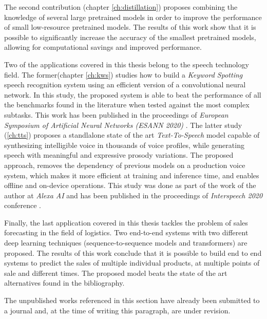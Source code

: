 The second contribution (chapter \ref{ch:distillation}) proposes combining the knowledge of several large pretrained models in order to improve the performance of small low-resource pretrained models. The results of this work show that it is possible to significantly increase the accuracy of the smallest pretrained models, allowing for computational savings and improved performance.

Two of the applications covered in this thesis belong to the speech technology field. The former(chapter \ref{ch:kws}) studies how to build a \textit{Keyword Spotting} speech recognition system using an efficient version of a convolutional neural network. In this study, the proposed system is able to beat the performance of all the benchmarks found in the literature when tested against the most complex subtasks. This work has been published in the proceedings of \textit{European Symposium of Artificial Neural Networks (ESANN 2020)} \autocite{valles2021a}. The latter study (\ref{ch:tts}) proposes a standlalone state of the art \textit{Text-To-Speech} model capable of synthesizing intelligible voice in thousands of voice profiles, while generating speech with meaningful and expressive prosody variations. The proposed approach, removes the dependency of previous models on a production voice system, which makes it more efficient at training and inference time, and enables offline and on-device operations. This study was done as part of the work of the author at \textit{Alexa AI} and has been published in the proceedings of \textit{Interspeech 2020} conference \autocite{valles2021b}.

Finally, the last application covered in this thesis tackles the problem of sales forecasting in the field of logistics. Two end-to-end systems with two different deep learning techniques (sequence-to-sequence models and transformers) are proposed. The results of this work conclude that it is possible to build end to end systems to predict the sales of multiple individual products, at multiple points of sale and different times. The proposed model beats the state of the art alternatives found in the bibliography.

The unpublished works referenced in this section have already been submitted to a journal and, at the time of writing this paragraph, are under revision.

